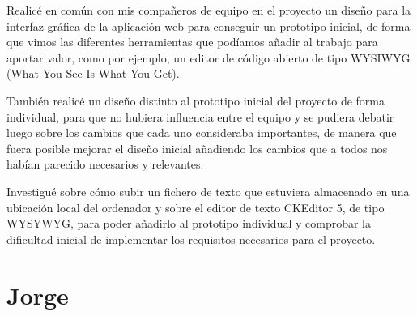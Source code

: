 Realicé en común con mis compañeros de equipo en el proyecto un diseño para la interfaz gráfica de la aplicación web para conseguir un prototipo inicial, de forma que vimos las diferentes herramientas que podíamos añadir al trabajo para aportar valor, como por ejemplo, un editor de código abierto de tipo WYSIWYG (What You See Is What You Get).

También realicé un diseño distinto al prototipo inicial del proyecto de forma individual, para que no hubiera influencia entre el equipo y se pudiera debatir luego sobre los cambios que cada uno consideraba importantes, de manera que fuera posible mejorar el diseño inicial añadiendo los cambios que a todos nos habían parecido necesarios y relevantes.

Investigué sobre cómo subir un fichero de texto que estuviera almacenado en una ubicación local del ordenador y sobre el editor de texto CKEditor 5, de tipo WYSYWYG, para poder añadirlo al prototipo individual y comprobar la dificultad inicial de implementar los requisitos necesarios para el proyecto.
	

\section{Jorge}
\label{cap6:sec:jorge}

	

